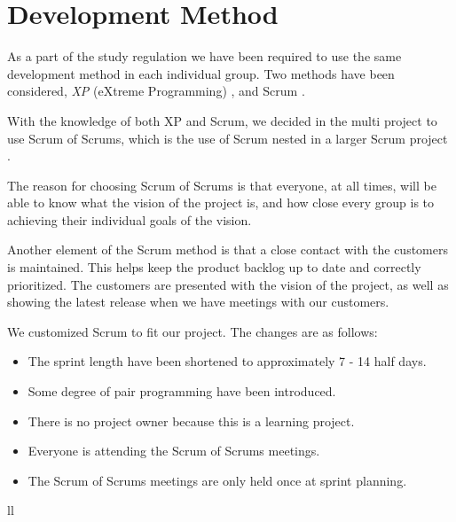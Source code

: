 \section{Development Method}
\label{sec:devmeth}

As a part of the study regulation we have been required to use the same development method in each individual group. Two methods have been considered, \textit{XP} (eXtreme Programming) \cite{XP}, and Scrum \cite{SCRUM}.

With the knowledge of both XP and Scrum, we decided in the multi project to use Scrum of Scrums, which is the use of Scrum nested in a larger Scrum project \cite{ScrumOfScrums}.

The reason for choosing Scrum of Scrums is that everyone, at all times, will be able to know what the vision of the project is, and how close every group is to achieving their individual goals of the vision.

Another element of the Scrum method is that a close contact with the customers is maintained. This helps keep the product backlog up to date and correctly prioritized. The customers are presented with the vision of the project, as well as showing the latest release when we have meetings with our customers.

We customized Scrum to fit our project. The changes are as follows:
\begin{itemize}
	\item The sprint length have been shortened to approximately 7 - 14 half days.
	\item Some degree of pair programming have been introduced.
	\item There is no project owner because this is a learning project.
	\item Everyone is attending the Scrum of Scrums meetings.
	\item The Scrum of Scrums meetings are only held once at sprint planning.
\end{itemize}

ll